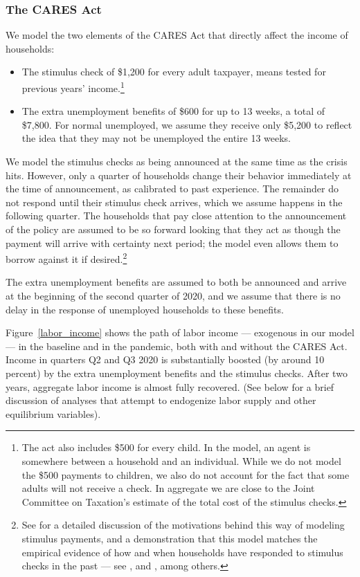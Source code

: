 \documentclass[titlepage]{\econtex}
\begin{document}
\subsubsection{The CARES Act}

We model the two elements of the CARES Act that directly affect the income of households:
\begin{itemize}
\item The stimulus check of \$1,200 for every adult taxpayer, means tested for previous years' income.\footnote{The act also includes \$500 for every child. In the model, an agent is somewhere between a household and an individual. While we do not model the \$500 payments to children, we also do not account for the fact that some adults will not receive a check. In aggregate we are close to the Joint Committee on Taxation's estimate of the total cost of the stimulus checks.}
\item The extra unemployment benefits of \$600 for up to 13 weeks, a total of \$7,800.
  For normal unemployed, we assume they receive only \$5,200 to reflect the idea that they may not be unemployed the entire 13 weeks.
\end{itemize}

We model the stimulus checks as being announced at the same time as the crisis hits.
However, only a quarter of households change their behavior immediately at the time of announcement, as calibrated to past experience.
The remainder do not respond until their stimulus check arrives, which we assume happens in the following quarter.
The households that pay close attention to the announcement of the policy are assumed to be so forward looking that they act as though the payment will arrive with certainty next period; the model even allows them to borrow against it if desired.\footnote{See \cite{carroll_sticky_2020} for a detailed discussion of the motivations behind this way of modeling stimulus payments, and a demonstration that this model matches the empirical evidence of how and when households have responded to stimulus checks in the past --- see \cite{psjmMPC2008}, \cite{brodaParker} and \cite{parker25million}, among others.}

The extra unemployment benefits are assumed to both be announced and arrive at the beginning of the second quarter of 2020, and we assume that there is no delay in the response of unemployed households to these benefits.

Figure~\ref{labor_income} shows the path of labor income --- exogenous in our model --- in the baseline and in the pandemic, both with and without the CARES Act.
Income in quarters Q2 and Q3 2020 is substantially boosted (by around 10 percent) by the extra unemployment benefits and the stimulus checks.
After two years, aggregate labor income is almost fully recovered.  (See below for a brief discussion of analyses that attempt to endogenize labor supply and other equilibrium variables).
\end{document}
